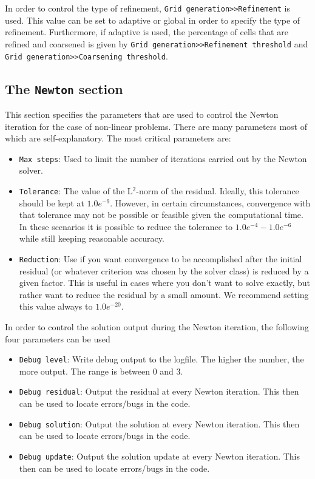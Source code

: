In order to control the type of refinement, \texttt{Grid generation>>Refinement} is used. This value can be set to adaptive or global in order to specify the type of refinement. Furthermore, if adaptive is used, the percentage of cells that are refined and coarsened is given by \texttt{Grid generation>>Refinement threshold} and \texttt{Grid generation>>Coarsening threshold}.

\subsection{The \texttt{Newton} section}

This section specifies the parameters that are used to control the Newton iteration for the case of non-linear problems. There are many parameters most of which are self-explanatory. The most critical parameters are:
\begin{itemize}
 \item \texttt{Max steps}: Used to limit the number of iterations carried out by the Newton solver.
 \item \texttt{Tolerance}: The value of the L${}^2$-norm of the residual. Ideally, this tolerance should be kept at $1.0e^{-9}$. However, in certain circumstances, convergence with that tolerance may not be possible or feasible given the computational time. In these scenarios it is possible to reduce the tolerance to $1.0e^{-4} - 1.0e^{-6}$ while still keeping reasonable accuracy.
 \item \texttt{Reduction}: Use if you want convergence to be accomplished after the initial residual (or whatever criterion was chosen by the solver class) is reduced by a given factor. This is useful in cases where you don't want to solve exactly, but rather want to reduce the residual by a small amount. We recommend setting this value always to $1.0e^{-20}$.
\end{itemize}

In order to control the solution output during the Newton iteration, the following four parameters can be used
\begin{itemize}
 \item \texttt{Debug level}: Write debug output to the logfile. The higher the number, the more output. The range is between 0 and 3.
 \item \texttt{Debug residual}: Output the residual at every Newton iteration. This then can be used to locate errors/bugs in the code.
 \item \texttt{Debug solution}: Output the solution at every Newton iteration. This then can be used to locate errors/bugs in the code.
 \item \texttt{Debug update}: Output the solution update at every Newton iteration. This then can be used to locate errors/bugs in the code.
\end{itemize}

